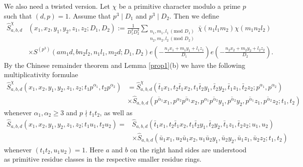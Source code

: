 \documentclass[11pt]{amsart}
\theoremstyle{plain}
\numberwithin{equation}{section}
\theoremstyle{definition}
\renewcommand{\geq}{\geqslant}
\begin{document}
We also need a twisted version. 
Let $\chi$ be a primitive character modulo a prime $p$ such that $(d, p) = 1$. Assume that $p^3 \mid D_1$ and $p^3 \mid D_2$. Then we define
\begin{equation}\label{shat}
\begin{split}
\widehat{S}^{\chi}_{a, b, d}&(x_1, x_2, y_1, y_2, z_1, z_2; D_1, D_2) := \frac{1}{D_1^3D_2^3}\sum_{\substack{ n_1, m_1, l_1 \, (\text{mod } D_1)\\n_2, m_2, l_2 \, (\text{mod } D_2)}} \bar{\chi}(n_1l_1m_2)\chi(m_1n_2l_2) \\
&\times S^{(p^3)}(am_1d, bn_2l_2, n_1l_1, m_2 d;D_1, D_2) e\left(-\frac{n_1x_1 + m_1y_1+l_1z_1}{D_1}\right) e\left(-\frac{n_2x_2 + m_2y_2+l_2z_2}{D_2}\right).
 \end{split}
 \end{equation}
 By  the Chinese remainder theorem and Lemma \ref{prop1}(b) we have the following multiplicativity formulae
 \begin{equation}\label{mult1}
 \begin{split}
 \widehat{S}^{\chi}_{a, b, d}(x_1, x_2, y_1, y_2, z_1, z_2;  t_1p^{\alpha_1}, t_2p^{\alpha_2}) & = \widehat{S}^{\chi}_{a, b, d}(\bar{t}_1x_1, t_2\bar{t}_1x_2, t_1\bar{t}_2y_1,  \bar{t}_2y_2, \bar{t}_1z_1, \bar{t}_2z_2; p^{\alpha_1}, p^{\alpha_2})\\
 & \times \widehat{S}_{a, b, d}( \overline{p^{\alpha_1}}x_1, p^{\alpha_2}\overline{p^{\alpha_1}}x_2, p^{\alpha_1}\overline{p^{\alpha_2}}y_1,  \overline{p^{\alpha_2}}y_2, \overline{p^{\alpha_1}}z_1, \overline{p^{\alpha_2}}z_2; t_1 , t_2)  \end{split}
 \end{equation}
 whenever $\alpha_1, \alpha_2 \geq 3$ and $p \nmid t_1t_2$, as well as
 \begin{equation}\label{mult2}
  \begin{split}
 \widehat{S} _{a, b, d}(x_1, x_2, y_1, y_2, z_1, z_2;  t_1u_1, t_2u_2) = &\widehat{S}_{a, b, d}(\bar{t}_1x_1, t_2\bar{t}_1x_2, t_1\bar{t}_2y_1, \bar{t}_2y_2, \bar{t}_1z_1, \bar{t}_2z_2; u_1, u_2)\\
 & \times \widehat{S}_{a, b, d}( \bar{u}_1x_1, u_2\bar{u}_1x_2,  u_1\bar{u}_2y_1, \bar{u}_2y_2, \bar{u}_1z_1,\bar{u}_2z_2; t_1 , t_2)  \end{split}
 \end{equation}
whenever $(t_1t_2, u_1u_2) = 1$. Here $a$ and $b$ on the   right hand sides are understood as primitive residue classes in the respective smaller residue rings.\\ 
 
\end{document}
